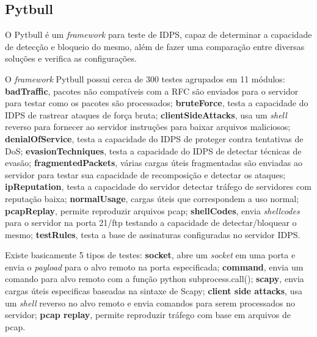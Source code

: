 \documentclass[
	12pt,				
	openright,		
	twoside,	
	a4paper,
	english,	
	brazil	
	]{abntex2}
\begin{document}
\subsection{Pytbull} \label{sec:pytbull}

O Pytbull é um \textit{framework} para teste de IDPS, capaz de determinar a capacidade de detecção e bloqueio do mesmo, além de fazer uma comparação entre diversas soluções e verifica as configurações.

O \textit{framework} Pytbull possui cerca de 300 testes agrupados em 11 módulos: \textbf{badTraffic}, pacotes não compatíveis com a RFC são enviados para o servidor para testar como os pacotes são processados; \textbf{bruteForce}, testa a capacidade do IDPS de rastrear ataques de força bruta; \textbf{clientSideAttacks}, usa um \textit{shell} reverso para fornecer ao servidor instruções para baixar arquivos maliciosos; \textbf{denialOfService}, testa a capacidade do IDPS de proteger contra tentativas de DoS; \textbf{evasionTechniques}, testa a capacidade do IDPS de detectar técnicas de evasão; \textbf{fragmentedPackets}, várias cargas úteis fragmentadas são enviadas ao servidor para testar sua capacidade de recomposição e detectar os ataques; \textbf{ipReputation}, testa a capacidade do servidor detectar tráfego de servidores com reputação baixa; \textbf{normalUsage}, cargas úteis que correspondem a uso normal; \textbf{pcapReplay}, permite reproduzir arquivos pcap; \textbf{shellCodes}, envia \textit{shellcodes} para o servidor na porta 21/ftp testando a capacidade de detectar/bloquear o mesmo;  \textbf{testRules}, testa a base de assinaturas configuradas no servidor IDPS.

Existe basicamente 5 tipos de testes: \textbf{socket}, abre um \textit{socket} em uma porta e envia o \textit{payload} para o alvo remoto na porta especificada; \textbf{command}, envia um comando para alvo remoto com a função python subprocess.call(); \textbf{scapy}, envia cargas úteis especificas baseadas na sintaxe de Scapy; \textbf{client side attacks}, usa um \textit{shell} reverso no alvo remoto e envia comandos para serem processados no servidor; \textbf{pcap replay}, permite reproduzir tráfego com base em arquivos de pcap.
\end{document}

